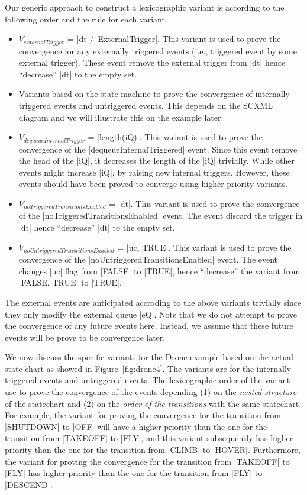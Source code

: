 Our generic approach to construct a lexicographic variant is according
to the following order and the rule for each variant.
\begin{itemize}
\item $V_{externalTrigger}$ = |dt /\ ExternalTrigger|.  This variant
  is used to prove the convergence for any externally triggered events
  (i.e., triggered event by some external trigger). These event remove
  the external trigger from |dt| hence ``decrease'' |dt| to the empty
  set.

\item Variants based on the state machine to prove the convergence of
  internally triggered events and untriggered events.  This depends on
  the SCXML diagram and we will illustrate this on the example later.
  
\item $V_{dequeueInternalTrigger}$ = |length(iQ)|.  This variant is
  used to prove the convergence of the |dequeueInternalTriggered| event.
  Since this event remove the head of the |iQ|, it decreases the
  length of the |iQ| trivially.  While other events might increase
  |iQ|, by raising new internal triggers. However, these events should
  have been proved to converge using higher-priority variants.
  
\item $V_{noTriggeredTransitionsEnabled}$ = |dt|.  This variant is used to
  prove the convergence of the |noTriggeredTransitionsEnabled| event.
  The event discard the trigger in |dt| hence ``decrease'' |dt| to the
  empty set.
  
\item $V_{noUntriggeredTranstitionsEnabled}$ = |{uc, TRUE}|.  This variant is
  used to prove the convergence of the
  |noUntriggeredTransitionsEnabled| event.  The event changes |uc|
  flag from |FALSE| to |TRUE|, hence ``decrease'' the variant from
  |{FALSE, TRUE}| to |{TRUE}|.
\end{itemize}
The external events are anticipated accroding to the above variants
trivially since they only modify the external queue |eQ|.  Note that
we do not attempt to prove the convergence of any future events
here. Instead, we assume that these future events will be prove to be
convergence later.

We now discuss the specific variants for the Drone example based on
the actual state-chart as showed in Figure~\ref{fig:drone4}.  The
variants are for the internally triggered events and untriggered
events. The lexicographic order of the variant use to prove the
convergence of the events depending (1) on the \emph{nested structure}
of the statechart and (2) on the \emph{order of the transitions} with
the same statechart.  For example, the variant for proving the
convergence for the transition from |SHUTDOWN| to |OFF| will have a
higher priority than the one for the transition from |TAKEOFF| to
|FLY|, and this variant subsequently has higher priority than the one
for the transition from |CLIMB| to |HOVER|.  Furthermore, the variant
for proving the convergence for the transition from |TAKEOFF| to |FLY|
has higher priority than the one for the transition from |FLY| to
|DESCEND|.

